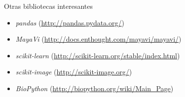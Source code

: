 \documentclass[xcolor=dvipsnames]{beamer}
\begin{document}
\begin{frame}{Otras bibliotecas interesantes}
	\begin{itemize}
		\item \emph{pandas} (\url{http://pandas.pydata.org/})
		\item \emph{MayaVi} (\url{http://docs.enthought.com/mayavi/mayavi/})
		\item \emph{scikit-learn} (\url{http://scikit-learn.org/stable/index.html})
		\item \emph{scikit-image} (\url{http://scikit-image.org/})
		\item \emph{BioPython} (\url{http://biopython.org/wiki/Main_Page})
	\end{itemize}
\end{frame}
\end{document}
